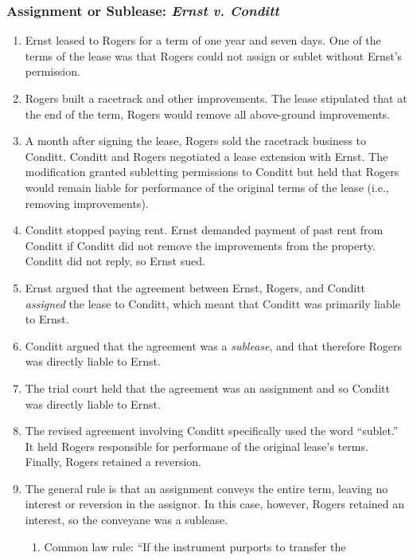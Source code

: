 \subsubsection{Assignment or Sublease: \emph{Ernst v. Conditt}}

\begin{enumerate}
    \item Ernst leased to Rogers for a term of one year and seven days. One of 
    the terms of the lease was that Rogers could not assign or sublet without 
    Ernst's permission.
    \item Rogers built a racetrack and other improvements. The lease 
    stipulated that at the end of the term, Rogers would remove all 
    above-ground improvements.
    \item A month after signing the lease, Rogers sold the racetrack business 
    to Conditt. Conditt and Rogers negotiated a lease extension with Ernst. 
    The modification granted subletting permissions to Conditt but held that 
    Rogers would remain liable for performance of the original terms of the 
    lease (i.e., removing improvements).
    \item Conditt stopped paying rent. Ernst demanded payment of past rent 
    from Conditt if Conditt did not remove the improvements from the property. 
    Conditt did not reply, so Ernst sued.
    \item Ernst argued that the agreement between Ernst, Rogers, and Conditt 
    \emph{assigned} the lease to Conditt, which meant that Conditt was 
    primarily liable to Ernst.
    \item Conditt argued that the agreement was a \emph{sublease}, and that 
    therefore Rogers was directly liable to Ernst.
    \item The trial court held that the agreement was an assignment and so 
    Conditt was directly liable to Ernst.
    \item The revised agreement involving Conditt specifically used the word 
    ``sublet.'' It held Rogers responsible for performane of the original 
    lease's terms. Finally, Rogers retained a reversion.
    \item The general rule is that an assignment conveys the entire term, 
    leaving no interest or reversion in the assignor. In this case, however, 
    Rogers retained an interest, so the conveyane was a sublease.
    \begin{enumerate}
        \item Common law rule: ``If the instrument purports to transfer the 

\end{enumerate}
\end{enumerate}
